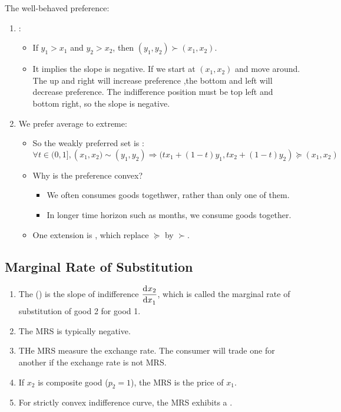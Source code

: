 The well-behaved preference:
\begin{enumerate}
    \item {}: 
        \begin{itemize}
            \item If $y_1 > x_1$ and $y_2 > x_2$, then $(y_1,y_2) \succ (x_1, x_2)$.
            \item It implies the slope is negative. If we start at $(x_1, x_2)$ and move around. The up and right will increase preference ,the bottom and left will decrease preference. The indifference position must be top left and bottom right, so the slope is negative.
        \end{itemize}
    \item We prefer average to extreme:
        \begin{itemize}
            \item So the weakly preferred set is :
                \begin{equation}
                    \forall t \in (0,1], \left(x_1,x_2) \sim (y_1,y_2) \Rightarrow (t x_1 + (1-t)y_1, t x_2 + (1-t)y_2 \right) \succeq (x_1,x_2)
                \end{equation}
            \item Why is the preference convex?
                \begin{itemize}
                    \item We often consumes goods togethwer, rather than only one of them.
                    \item In longer time horizon such as months, we consume goods together.
                \end{itemize}
            \item One extension is , which replace $\succeq$ by $\succ$.
        \end{itemize}
\end{enumerate}




\subsection{Marginal Rate of Substitution}

\begin{enumerate}
    \item The  () is the slope of indifference $\dod{x_2}{x_1}$, which is called the marginal rate of substitution of good 2 for good 1. 
    \item The MRS is typically negative.
    \item THe MRS measure the exchange rate. The consumer will trade one for another if the exchange rate is not MRS.
    \item If $x_2$ is composite good ($p_2 = 1$), the MRS is the price of $x_1$.
    \item For strictly convex indifference curve, the MRS exhibits a .
\end{enumerate}




